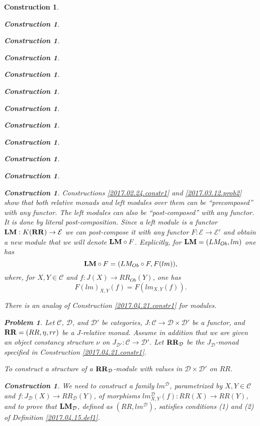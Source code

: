 \documentclass[12pt]{amsart}
\numberwithin{proposition}{subsection}
\newtheorem{problem}[proposition]{Problem}
\newtheorem{construction}[proposition]{Construction}
\newcommand{\llabel}[1]{\label{#1}}
\newcommand{\sr}{\rightarrow}
\newcommand{\RR}{{\bf RR}}
\newcommand{\LM}{{\bf LM}}
\newcommand{\C}{{\mathcal C}}
\newcommand{\D}{{\mathcal D}}
\newcommand{\E}{{\mathcal E}}
\begin{document}
\begin{construction}
\begin{construction}
\begin{construction}
\begin{construction}
\begin{construction}
\begin{construction}
\begin{construction}
\begin{construction}
\begin{construction}
\begin{construction}
\begin{construction}
\begin{construction}
Constructions \ref{2017.02.24.constr1} and \ref{2017.03.12.prob2} show that
both relative monads and left modules over them can be ``precomposed'' with any
functor. The left modules can also be ``post-composed'' with any functor. It is
done by literal post-composition. Since a left module is a functor
$\LM:K(\RR)\sr \E$ we can post-compose it with any functor $F:\E\sr \E'$ and
obtain a new module that we will denote $\LM\circ F$. Explicitly, for
$\LM=(LM_{Ob},lm)$ one has
%
$$\LM\circ F=(LM_{Ob}\circ F, F(lm)),$$
%
where, for $X,Y\in \C$ and $f:J(X)\sr RR_{Ob}(Y)$, one has
%
$$F(lm)_{X,Y}(f)=F(lm_{X,Y}(f)).$$
%

There is an analog of Construction \ref{2017.04.21.constr1} for modules.
%
\begin{problem}
\llabel{2017.04.23.prob2}
Let $\C$, $\D$, and $\D'$ be categories, $J:\C\sr \D\times\D'$ be a functor, and $\RR=(RR,\eta,rr)$ be a $J$-relative monad.
Assume in addition that we are given an object constancy structure $\nu$ on $J_{\D'}:\C\sr\D'$. 
Let $\RR_{\D}$ be the $J_{\D}$-monad specified in Construction \ref{2017.04.21.constr1}.  

To construct a structure of a $\RR_{\D}$-module with values in $\D\times\D'$ on $RR$. 
\end{problem}
%
\begin{construction}\rm
\llabel{2017.04.23.constr2}
We need to construct a family $lm^{\D}$, parametrized by $X,Y\in\C$ and
$f:J_{\D}(X)\sr RR_{\D}(Y)$, of morphisms $lm^{\D}_{X,Y}(f):RR(X)\sr RR(Y)$,
and to prove that $\LM_{\D}$, defined as $(RR,lm^{\D})$, satisfies conditions
(1) and (2) of Definition \ref{2017.04.15.def1}.


\end{construction}
\end{construction}
\end{construction}
\end{construction}
\end{construction}
\end{construction}
\end{construction}
\end{construction}
\end{construction}
\end{construction}
\end{construction}
\end{construction}
\end{construction}
\end{document}
